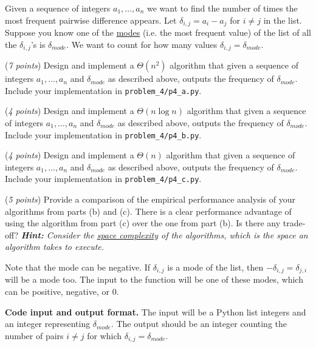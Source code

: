 \documentclass{hw}
\newcommand{\io}{\textbf{Code input and output format.} }
\begin{document}
\begin{problem}
  Given a sequence of integers $a_1,\ldots,a_n$ we want to find the
  number of times the most frequent pairwise difference appears.
  Let $\delta_{i, j} = a_i - a_j$ for $i \ne j$ in the list. Suppose you know one of the \href{https://en.wikipedia.org/wiki/Mode_(statistics)}{modes} (i.e. the most frequent value) of the list of all the $\delta_{i, j}$'s is $\delta_{mode}$. We want to count for how many values $\delta_{i, j} = \delta_{mode}$. 

  \begin{subproblem}
    (\textit{7 points})
    Design and implement a $\Theta(n ^ 2)$ algorithm that given a sequence of integers $a_1,\ldots,a_n$ and $\delta_{mode}$ as described above, outputs the frequency of $\delta_{mode}$. Include your implementation in \texttt{problem\_4/p4\_a.py}.
  \end{subproblem}
  \begin{subproblem}
    (\textit{4 points})
    Design and implement a $\Theta(n \log n)$ algorithm that given a sequence of integers $a_1,\ldots,a_n$ and $\delta_{mode}$ as described above, outputs the frequency of $\delta_{mode}$. Include your implementation in \texttt{problem\_4/p4\_b.py}.
  \end{subproblem}
  \begin{subproblem}
    (\textit{4 points})
    Design and implement a $\Theta(n)$ algorithm that given a sequence of integers $a_1,\ldots,a_n$ and $\delta_{mode}$ as described above, outputs the frequency of $\delta_{mode}$. Include your implementation in \texttt{problem\_4/p4\_c.py}.
  \end{subproblem}
  \begin{subproblem}
    (\textit{5 points})
    Provide a comparison of the empirical performance analysis of your algorithms from parts (b) and (c). There is a clear performance advantage of using the algorithm from part (c) over the one from part (b). Is there any trade-off? \textit{\textbf{Hint:} Consider the \href{https://en.wikipedia.org/wiki/Space_complexity}{space complexity} of the algorithms, which is the space an algorithm takes to execute.}
  \end{subproblem}
  Note that the mode can be negative. If $\delta_{i, j}$ is a mode of the list,
  then $-\delta_{i, j} = \delta_{j, i}$ will be a mode too. The input to the
  function will be one of these modes, which can be positive, negative, or 0.

  \io The input will be a Python list integers and an integer representing $\delta_{mode}$. The output should be an integer counting the number of pairs $i \ne j$ for which $\delta_{i, j} = \delta_{mode}$.

\end{problem}
\newpage
\end{document}
